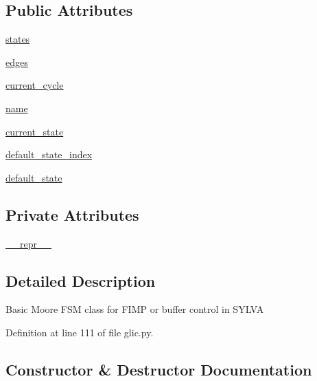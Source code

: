 \subsection*{Public Attributes}
\begin{DoxyCompactItemize}
\item 
\hyperlink{classsylva_1_1glic_1_1glic_1_1control_a392a1e20052ef15fa96049f9b201be02}{states}
\item 
\hyperlink{classsylva_1_1glic_1_1glic_1_1control_ae0839083f2b17473598890c7b4690e4f}{edges}
\item 
\hyperlink{classsylva_1_1glic_1_1glic_1_1control_a1e5f2d48e2bfafe60f1891e0dcb1d98a}{current\+\_\+cycle}
\item 
\hyperlink{classsylva_1_1glic_1_1glic_1_1control_a95f657f58c1799fe7004653fe77ce106}{name}
\item 
\hyperlink{classsylva_1_1glic_1_1glic_1_1control_a7f5428a930e8f920ebe651df5a899df1}{current\+\_\+state}
\item 
\hyperlink{classsylva_1_1glic_1_1glic_1_1control_a7c5053b405b4811c446caa027cd29d7e}{default\+\_\+state\+\_\+index}
\item 
\hyperlink{classsylva_1_1glic_1_1glic_1_1control_a2ccde55faf999d2c91c456eaac9bdee3}{default\+\_\+state}
\end{DoxyCompactItemize}
\subsection*{Private Attributes}
\begin{DoxyCompactItemize}
\item 
\hyperlink{classsylva_1_1glic_1_1glic_1_1control_ac4ec61e55ba16dd0abcd97a493be8f0d}{\+\_\+\+\_\+repr\+\_\+\+\_\+}
\end{DoxyCompactItemize}


\subsection{Detailed Description}
\begin{DoxyVerb}  Basic Moore FSM class for FIMP or buffer control in SYLVA
\end{DoxyVerb}
 

Definition at line 111 of file glic.\+py.



\subsection{Constructor \& Destructor Documentation}
\mbox{\label{classsylva_1_1glic_1_1glic_1_1control_a85d706a6833a83aa424d631d85368099}} 
